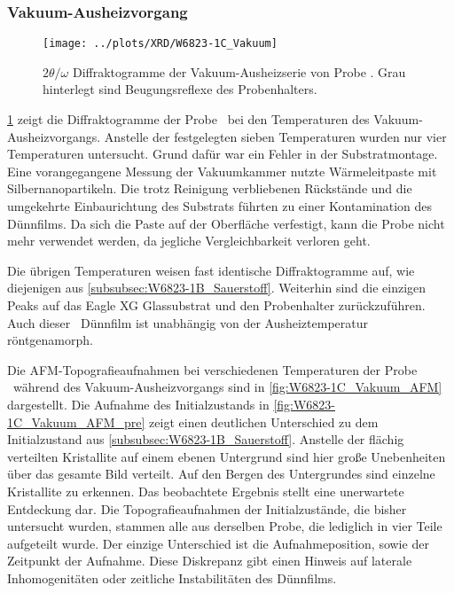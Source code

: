\subsubsection{Vakuum-Ausheizvorgang}\label{subsubsec:W6823-1C_Vakuum}
\begin{figure}
    \centering
    \texttt{[image: ../plots/XRD/W6823-1C\_Vakuum]}
    \caption{$2\theta/\omega$ Diffraktogramme der Vakuum-Ausheizserie von Probe \samplethree.
    Grau hinterlegt sind Beugungsreflexe des Probenhalters.}
    \label{fig:W6823-1C_Vakuum_XRD}
\end{figure}
\cref{fig:W6823-1C_Vakuum_XRD} zeigt die Diffraktogramme der Probe \samplethree\ bei
den Temperaturen des Vakuum-Ausheizvorgangs.
Anstelle der festgelegten sieben Temperaturen wurden nur vier Temperaturen untersucht.
Grund dafür war ein Fehler in der Substratmontage.
Eine vorangegangene Messung der Vakuumkammer nutzte Wärmeleitpaste mit Silbernanopartikeln.
Die trotz Reinigung verbliebenen Rückstände und die umgekehrte Einbaurichtung des Substrats
führten zu einer Kontamination des Dünnfilms.
Da sich die Paste auf der Oberfläche verfestigt, kann die Probe nicht mehr verwendet werden, da jegliche
Vergleichbarkeit verloren geht.

Die übrigen Temperaturen weisen fast identische Diffraktogramme auf, wie diejenigen aus
\cref{subsubsec:W6823-1B_Sauerstoff}.
Weiterhin sind die einzigen Peaks auf das Eagle XG Glassubstrat und den Probenhalter zurückzuführen.
Auch dieser \heo\ Dünnfilm ist unabhängig von der Ausheiztemperatur röntgenamorph.

Die AFM-Topografieaufnahmen bei verschiedenen Temperaturen der Probe \samplethree\ während des Vakuum-Ausheizvorgangs
sind in \cref{fig:W6823-1C_Vakuum_AFM} dargestellt.
Die Aufnahme des Initialzustands in \cref{fig:W6823-1C_Vakuum_AFM_pre} zeigt einen deutlichen Unterschied zu dem
Initialzustand aus \cref{subsubsec:W6823-1B_Sauerstoff}.
Anstelle der flächig verteilten Kristallite auf einem ebenen Untergrund sind hier große Unebenheiten
über das gesamte Bild verteilt.
Auf den Bergen des Untergrundes sind einzelne Kristallite zu erkennen.
Das beobachtete Ergebnis stellt eine unerwartete Entdeckung dar.
Die Topografieaufnahmen der Initialzustände, die bisher untersucht wurden, stammen alle aus derselben Probe, die
lediglich in vier Teile aufgeteilt wurde.
Der einzige Unterschied ist die Aufnahmeposition, sowie der Zeitpunkt der Aufnahme.
Diese Diskrepanz gibt einen Hinweis auf laterale Inhomogenitäten oder zeitliche Instabilitäten des Dünnfilms.


